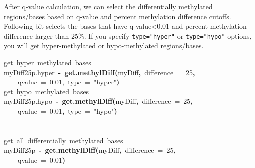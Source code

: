 \documentclass{article}
\makeatletter
\newcommand{\hlnumber}[1]{\textcolor[rgb]{0,0,0}{#1}}%
\newcommand{\hlfunctioncall}[1]{\textcolor[rgb]{.5,0,.33}{\textbf{#1}}}%
\newcommand{\hlstring}[1]{\textcolor[rgb]{.6,.6,1}{#1}}%
\newcommand{\hlkeyword}[1]{\textbf{#1}}%
\newcommand{\hlargument}[1]{\textcolor[rgb]{.69,.25,.02}{#1}}%
\newcommand{\hlcomment}[1]{\textcolor[rgb]{.18,.6,.34}{#1}}%
\newcommand{\hlassignement}[1]{\textbf{#1}}%
\newcommand{\hlsymbol}[1]{#1}%
\newcommand{\hlstd}[1]{\textcolor[rgb]{0,0,0}{#1}}%
\newenvironment{kframe}{%
 \def\FrameCommand##1{\hskip\@totalleftmargin \hskip-\fboxsep
 \colorbox{shadecolor}{##1}\hskip-\fboxsep
     \hskip-\linewidth \hskip-\@totalleftmargin \hskip\columnwidth}%
 \MakeFramed {\advance\hsize-\width
   \@totalleftmargin\z@ \linewidth\hsize
   \@setminipage}}%
 {\par\unskip\endMakeFramed}
\newenvironment{knitrout}{}{} %
\makeatother
\begin{document}
After q-value calculation, we can select the differentially methylated regions/bases based on q-value and percent methylation difference cutoffs. Following bit selects the bases that have q-value<0.01 and percent methylation difference larger than 25\%. If you specify \texttt{type="hyper"} or \texttt{type="hypo"} options, you will get hyper-methylated or hypo-methylated regions/bases.
\begin{knitrout}
\color{fgcolor}\begin{kframe}
\begin{flushleft}
\ttfamily\noindent
\hlcomment{\usebox{\hlnormalsizeboxhash}{\ }get{\ }hyper{\ }methylated{\ }bases}\hspace*{\fill}\\
\hlstd{}\hlsymbol{myDiff25p.hyper}{\ }\hlassignement{\usebox{\hlnormalsizeboxlessthan}-}{\ }\hlfunctioncall{get.methylDiff}\hlkeyword{(}\hlsymbol{myDiff}\hlkeyword{,}{\ }\hlargument{difference}{\ }\hlargument{=}{\ }\hlnumber{25}\hlkeyword{,}\hspace*{\fill}\\
\hlstd{}{\ }{\ }{\ }{\ }\hlargument{qvalue}{\ }\hlargument{=}{\ }\hlnumber{0.01}\hlkeyword{,}{\ }\hlargument{type}{\ }\hlargument{=}{\ }\hlstring{"{}hyper"{}}\hlkeyword{)}\hspace*{\fill}\\
\hlstd{}\hlcomment{\usebox{\hlnormalsizeboxhash}{\ }get{\ }hypo{\ }methylated{\ }bases}\hspace*{\fill}\\
\hlstd{}\hlsymbol{myDiff25p.hypo}{\ }\hlassignement{\usebox{\hlnormalsizeboxlessthan}-}{\ }\hlfunctioncall{get.methylDiff}\hlkeyword{(}\hlsymbol{myDiff}\hlkeyword{,}{\ }\hlargument{difference}{\ }\hlargument{=}{\ }\hlnumber{25}\hlkeyword{,}\hspace*{\fill}\\
\hlstd{}{\ }{\ }{\ }{\ }\hlargument{qvalue}{\ }\hlargument{=}{\ }\hlnumber{0.01}\hlkeyword{,}{\ }\hlargument{type}{\ }\hlargument{=}{\ }\hlstring{"{}hypo"{}}\hlkeyword{)}\hspace*{\fill}\\
\hlstd{}\hlcomment{\usebox{\hlnormalsizeboxhash}}\hspace*{\fill}\\
\hlstd{}\hlcomment{\usebox{\hlnormalsizeboxhash}{\ }}\hspace*{\fill}\\
\hlstd{}\hlcomment{\usebox{\hlnormalsizeboxhash}{\ }get{\ }all{\ }differentially{\ }methylated{\ }bases}\hspace*{\fill}\\
\hlstd{}\hlsymbol{myDiff25p}{\ }\hlassignement{\usebox{\hlnormalsizeboxlessthan}-}{\ }\hlfunctioncall{get.methylDiff}\hlkeyword{(}\hlsymbol{myDiff}\hlkeyword{,}{\ }\hlargument{difference}{\ }\hlargument{=}{\ }\hlnumber{25}\hlkeyword{,}\hspace*{\fill}\\
\hlstd{}{\ }{\ }{\ }{\ }\hlargument{qvalue}{\ }\hlargument{=}{\ }\hlnumber{0.01}\hlkeyword{)}\mbox{}
\normalfont
\end{flushleft}
\end{kframe}
\end{knitrout}
\end{document}
